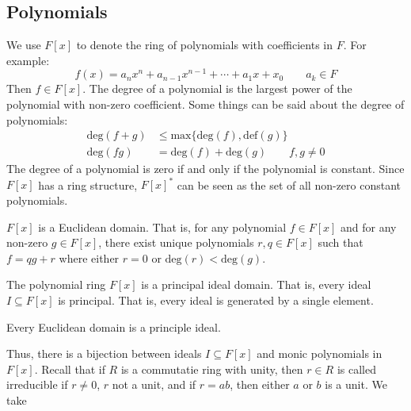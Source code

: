 \documentclass{article}                                                        %
\begin{document}
        \subsection{Polynomials}
            We use $F[x]$ to denote the ring of polynomials with coefficients in
            $F$. For example:
            \begin{equation}
                f(x)=a_{n}x^{n}+a_{n-1}x^{n-1}+\cdots+a_{1}x+x_{0}
                \quad\quad
                a_{k}\in{F}
            \end{equation}
            Then $f\in{F}[x]$. The degree of a polynomial is the largest power
            of the polynomial with non-zero coefficient. Some things can be said
            about the degree of polynomials:
            \begin{align}
                \textrm{deg}(f+g)&\leq
                    \textrm{max}\{\textrm{deg}(f),\textrm{def}(g)\}\\
                \textrm{deg}(fg)&=\textrm{deg}(f)+\textrm{deg}(g)
                \quad\quad
                f,g\ne{0}
            \end{align}
            The degree of a polynomial is zero if and only if the polynomial is
            constant. Since $F[x]$ has a ring structure, $F[x]^{*}$ can be seen
            as the set of all non-zero constant polynomials.
            \begin{theorem}
                $F[x]$ is a Euclidean domain. That is, for any polynomial
                $f\in{F}[x]$ and for any non-zero $g\in{F}[x]$, there exist
                unique polynomials $r,q\in{F}[x]$ such that $f=qg+r$ where
                either $r=0$ or $\textrm{deg}(r)<\textrm{deg}(g)$.
            \end{theorem}
            \begin{theorem}
                The polynomial ring $F[x]$ is a principal ideal domain. That is,
                every ideal $I\subseteq{F}[x]$ is principal. That is, every
                ideal is generated by a single element.
            \end{theorem}
            \begin{theorem}
                Every Euclidean domain is a principle ideal.
            \end{theorem}
            Thus, there is a bijection between ideals $I\subseteq{F}[x]$ and
            monic polynomials in $F[x]$. Recall that if $R$ is a commutatie ring
            with unity, then $r\in{R}$ is called irreducible if $r\ne{0}$, $r$
            not a unit, and if $r=ab$, then either $a$ or $b$ is a unit. We take
\end{document}
